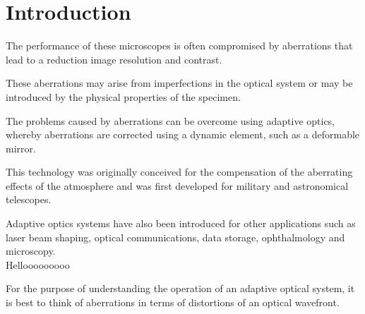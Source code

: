 \section{Introduction}
\label{sec:Introduction}

The performance of these microscopes is often compromised by aberrations that lead to a reduction image resolution and contrast. 

These aberrations may arise from imperfections in the optical system or may be introduced by the physical properties of the specimen.
 
The problems caused by aberrations can be overcome using adaptive optics, whereby aberrations are corrected using a dynamic element, such as a deformable mirror.

This technology was originally conceived for the compensation of the aberrating effects of the atmosphere and was first developed for military and astronomical telescopes. 

Adaptive optics systems have also been introduced for other applications such as laser beam shaping, optical communications, data storage, ophthalmology and microscopy.\\
Hellooooooooo

\cite{Aberrations_book} 



For the purpose of understanding the operation of an adaptive optical system, it is best to think of aberrations in terms of distortions of an optical wavefront.

